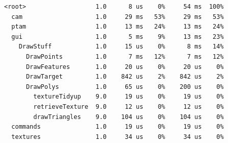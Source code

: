 \documentclass[a4paper,10pt]{article}
\begin{document}
\begin{enumerate}
{\begin{verbatim}
<root>                   1.0      8 us    0%     54 ms  100%
  cam                    1.0     29 ms   53%     29 ms   53%
  ptam                   1.0     13 ms   24%     13 ms   24%
  gui                    1.0      5 ms    9%     13 ms   23%
    DrawStuff            1.0     15 us    0%      8 ms   14%
      DrawPoints         1.0      7 ms   12%      7 ms   12%
      DrawFeatures       1.0     20 us    0%     20 us    0%
      DrawTarget         1.0    842 us    2%    842 us    2%
      DrawPolys          1.0     65 us    0%    200 us    0%
        textureTidyup    9.0     19 us    0%     19 us    0%
        retrieveTexture  9.0     12 us    0%     12 us    0%
        drawTriangles    9.0    104 us    0%    104 us    0%
  commands               1.0     19 us    0%     19 us    0%
  textures               1.0     34 us    0%     34 us    0%
\end{verbatim}
}
\end{enumerate}
\end{document}
